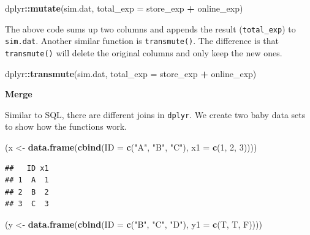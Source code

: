 \documentclass[12pt,]{krantz}
\makeatletter
\newenvironment{Shaded}{\begin{snugshade}}{\end{snugshade}}
\newcommand{\DataTypeTok}[1]{\textcolor[rgb]{0.27,0.27,0.27}{#1}}
\newcommand{\DecValTok}[1]{\textcolor[rgb]{0.06,0.06,0.06}{#1}}
\newcommand{\KeywordTok}[1]{\textcolor[rgb]{0.27,0.27,0.27}{\textbf{#1}}}
\newcommand{\NormalTok}[1]{#1}
\newcommand{\OperatorTok}[1]{\textcolor[rgb]{0.43,0.43,0.43}{\textbf{#1}}}
\newcommand{\StringTok}[1]{\textcolor[rgb]{0.5,0.5,0.5}{#1}}
\newenvironment{kframe}{%
\medskip{}
\setlength{\fboxsep}{.8em}
 \def\at@end@of@kframe{}%
 \ifinner\ifhmode%
  \def\at@end@of@kframe{\end{minipage}}%
  \begin{minipage}{\columnwidth}%
 \fi\fi%
 \def\FrameCommand##1{\hskip\@totalleftmargin \hskip-\fboxsep
 \colorbox{shadecolor}{##1}\hskip-\fboxsep
     \hskip-\linewidth \hskip-\@totalleftmargin \hskip\columnwidth}%
 \MakeFramed {\advance\hsize-\width
   \@totalleftmargin\z@ \linewidth\hsize
   \@setminipage}}%
 {\par\unskip\endMakeFramed%
 \at@end@of@kframe}
\renewenvironment{Shaded}{\begin{kframe}}{\end{kframe}}
\makeatother
\begin{document}
\begin{Shaded}
\begin{Highlighting}[]
\NormalTok{dplyr}\OperatorTok{::}\KeywordTok{mutate}\NormalTok{(sim.dat, }\DataTypeTok{total_exp =}\NormalTok{ store_exp }\OperatorTok{+}\StringTok{ }\NormalTok{online_exp)}
\end{Highlighting}
\end{Shaded}

The above code sums up two columns and appends the result (\texttt{total\_exp}) to \texttt{sim.dat}. Another similar function is \texttt{transmute()}. The difference is that \texttt{transmute()} will delete the original columns and only keep the new ones.

\begin{Shaded}
\begin{Highlighting}[]
\NormalTok{dplyr}\OperatorTok{::}\KeywordTok{transmute}\NormalTok{(sim.dat, }\DataTypeTok{total_exp =}\NormalTok{ store_exp }\OperatorTok{+}\StringTok{ }\NormalTok{online_exp)}
\end{Highlighting}
\end{Shaded}

\textbf{Merge}

Similar to SQL, there are different joins in \texttt{dplyr}. We create two baby data sets to show how the functions work.

\begin{Shaded}
\begin{Highlighting}[]
\NormalTok{(x <-}\StringTok{ }\KeywordTok{data.frame}\NormalTok{(}\KeywordTok{cbind}\NormalTok{(}\DataTypeTok{ID =} \KeywordTok{c}\NormalTok{(}\StringTok{"A"}\NormalTok{, }\StringTok{"B"}\NormalTok{, }\StringTok{"C"}\NormalTok{), }\DataTypeTok{x1 =} \KeywordTok{c}\NormalTok{(}\DecValTok{1}\NormalTok{, }\DecValTok{2}\NormalTok{, }\DecValTok{3}\NormalTok{))))}
\end{Highlighting}
\end{Shaded}

\begin{verbatim}
##   ID x1
## 1  A  1
## 2  B  2
## 3  C  3
\end{verbatim}

\begin{Shaded}
\begin{Highlighting}[]
\NormalTok{(y <-}\StringTok{ }\KeywordTok{data.frame}\NormalTok{(}\KeywordTok{cbind}\NormalTok{(}\DataTypeTok{ID =} \KeywordTok{c}\NormalTok{(}\StringTok{"B"}\NormalTok{, }\StringTok{"C"}\NormalTok{, }\StringTok{"D"}\NormalTok{), }\DataTypeTok{y1 =} \KeywordTok{c}\NormalTok{(T, T, F))))}
\end{Highlighting}
\end{Shaded}
\end{document}
